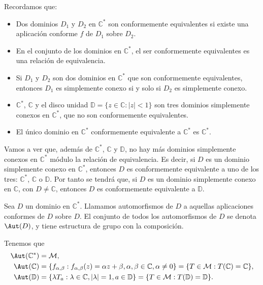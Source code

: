 Recordamos que:
\begin{itemize}
    \item Dos dominios $D_1$ y $D_2$ en $\mathbb{C}^\ast$ son conformemente equivalentes si existe una aplicación conforme $f$ de $D_1$ sobre $D_2$.
    \item En el conjunto de los dominios en $\mathbb{C}^\ast$, el ser conformemente equivalentes es una relación de equivalencia.
    \item Si $D_1$ y $D_2$ son dos dominios en $\mathbb{C}^\ast$ que son conformemente equivalentes, entonces $D_1$ es simplemente conexo si y solo si $D_2$ es simplemente conexo.
    \item $\mathbb{C}^\ast$, $\mathbb{C}$ y el disco unidad $\mathbb{D} = \{z \in \mathbb{C} : |z| < 1\}$ son tres dominios simplemente conexos en $\mathbb{C}^\ast$, que no son conformemente equivalentes.
    \item El único dominio en $\mathbb{C}^\ast$ conformemente equivalente a $\mathbb{C}^\ast$ es $\mathbb{C}^\ast$.
\end{itemize}

Vamos a ver que, además de $\mathbb{C}^\ast$, $\mathbb{C}$ y $\mathbb{D}$, no hay más dominios simplemente conexos en $\mathbb{C}^\ast$ módulo la relación de equivalencia.
Es decir, si $D$ es un dominio simplemente conexo en $\mathbb{C}^\ast$, entonces $D$ es conformemente equivalente a uno de los tres: $\mathbb{C}^\ast$, $\mathbb{C}$ o $\mathbb{D}$.
Por tanto se tendrá que, si $D$ es un dominio simplemente conexo en $\mathbb{C}$, con $D \neq \mathbb{C}$, entonces $D$ es conformemente equivalente a $\mathbb{D}$.

\begin{definition}
    Sea $D$ un dominio en $\mathbb{C}^\ast$.
    Llamamos automorfismos de $D$ a aquellas aplicaciones conformes de $D$ sobre $D$.
    El conjunto de todos los automorfismos de $D$ se denota $\Aut(D)$, y tiene estructura de grupo con la composición.
\end{definition}

Tenemos que
\begin{align*}
    \Aut(\mathbb{C}^\ast) & = \mathcal{M},                                                                                                                                                       \\
    \Aut(\mathbb{C})      & = \{f_{\alpha, \beta} : f_{\alpha, \beta}(z) = \alpha z + \beta, \alpha, \beta \in \mathbb{C}, \alpha \neq 0\} = \{T \in \mathcal{M} : T(\mathbb{C}) = \mathbb{C}\}, \\
    \Aut(\mathbb{D})      & = \{\lambda T_a : \lambda \in \mathbb{C}, |\lambda| = 1, a \in \mathbb{D}\} = \{T \in \mathcal{M} : T(\mathbb{D}) = \mathbb{D}\}.
\end{align*}

